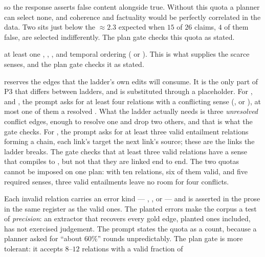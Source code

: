 \begin{description}[leftmargin=1.2em,itemsep=2pt,topsep=3pt,font=\normalfont\itshape]
\item[At least two false claims are selected,] so the response asserts false content alongside true. Without
  this quota a planner can select none, and coherence and factuality would be perfectly correlated in the data.
  Two sits just below the $\approx 2.3$ expected when $15$ of $26$ claims, $4$ of them false, are selected
  indifferently. The plan gate checks this quota as stated.
\item[Five senses are required:] at least one , , ,
   and temporal ordering ( or ). This is what supplies the
  scarce senses, and the plan gate checks it as stated.
\item[A ladder-specific quota] reserves the edges that the ladder's own edits will consume. It is the only part
  of P3 that differs between ladders, and is substituted through a placeholder. For ,
   and , the prompt asks for at least four relations with a conflicting sense
  (,  or ), at most one of them a resolved
  . What the  ladder actually needs is three \emph{unresolved} conflict edges,
  enough to resolve one and drop two others, and that is what the gate checks. For , the prompt
  asks for at least three valid entailment relations forming a chain, each link's target the next link's source;
  these are the links the ladder breaks. The gate checks that at least three valid relations have a sense that
  compiles to \ent{}, but not that they are linked end to end. The two quotas cannot be imposed on one plan: with
  ten relations, six of them valid, and five required senses, three valid entailments leave no room for four
  conflicts.
\item[Exactly six relations are valid and four invalid.] Each invalid relation carries an error kind ---
  , ,  or  --- and is asserted in
  the prose in the same register as the valid ones. The planted errors make the corpus a test of
  \emph{precision}: an extractor that recovers every gold edge, planted ones included, has not exercised
  judgement. The prompt states the quota as a count, because a planner asked for ``about $60\%$'' rounds
  unpredictably. The plan gate is more tolerant: it accepts $8$--$12$ relations with a valid fraction of

\end{description}

